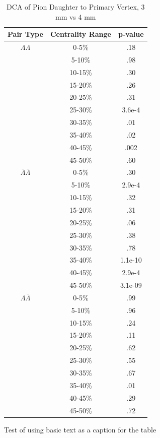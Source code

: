\begin{table}
\caption {DCA of Pion Daughter to Primary Vertex, 3 mm vs 4 mm} \label{tab:DcaPionPvalueTests3mmVs4mm}
\begin{center}
\begin{tabular}{| c | c | c |}
  \hline                       
  Pair Type & Centrality Range & p-value \\
  \hline
  $\Lambda\Lambda$ & 0-5\% & .18 \\
   & 5-10\%  & .98 \\
   & 10-15\% & .30 \\
   & 15-20\% & .26 \\
   & 20-25\% & .31 \\
   & 25-30\% & 3.6e-4 \\
   & 30-35\% & .01 \\
   & 35-40\% & .02 \\
   & 40-45\% & .002 \\
   & 45-50\% & .60 \\
   \hline
  $\bar{\Lambda}\bar{\Lambda}$ &  0-5\% & .30 \\
   & 5-10\% & 2.9e-4 \\
   & 10-15\% & .32 \\
   & 15-20\% & .31 \\
   & 20-25\% & .06 \\
   & 25-30\% & .38 \\
   & 30-35\% & .78 \\
   & 35-40\% & 1.1e-10 \\
   & 40-45\% & 2.9e-4 \\
   & 45-50\% & 3.1e-09 \\
   \hline
  $\Lambda\bar{\Lambda}$ &  0-5\% & .99 \\
   & 5-10\% & .96 \\
   & 10-15\% & .24 \\
   & 15-20\% & .11 \\
   & 20-25\% & .62 \\
   & 25-30\% & .55 \\
   & 30-35\% & .67 \\
   & 35-40\% & .01 \\
   & 40-45\% & .29 \\
   & 45-50\% & .72 \\
  \hline  
\end{tabular}
Test of using basic text as a caption for the table
\end{center}
\end{table}



